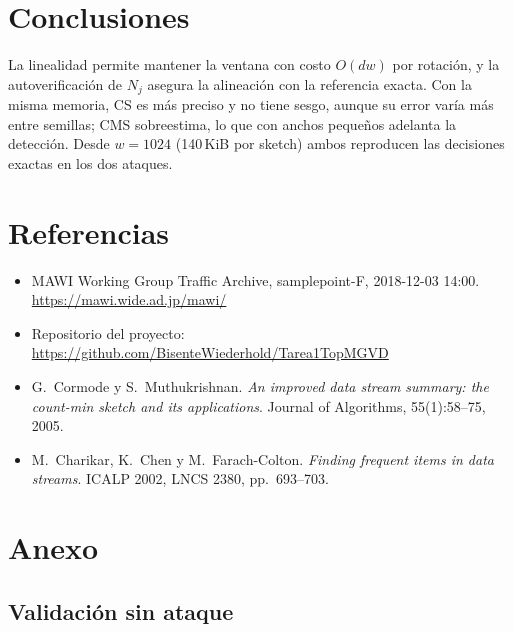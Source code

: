 \documentclass[11pt]{article}
\begin{document}
\section{Conclusiones}

La linealidad permite mantener la ventana con costo $O(dw)$ por rotación, y la autoverificación de $N_j$ asegura la alineación con la referencia exacta. Con la misma memoria, CS es más preciso y no tiene sesgo, aunque su error varía más entre semillas; CMS sobreestima, lo que con anchos pequeños adelanta la detección. Desde $w=1024$ (140\,KiB por sketch) ambos reproducen las decisiones exactas en los dos ataques.

\section{Referencias}

\begin{itemize}
    \item MAWI Working Group Traffic Archive, samplepoint-F, 2018-12-03 14:00. \url{https://mawi.wide.ad.jp/mawi/}
    \item Repositorio del proyecto: \url{https://github.com/BisenteWiederhold/Tarea1TopMGVD}
    \item G.~Cormode y S.~Muthukrishnan. \emph{An improved data stream summary: the count-min sketch and its applications}. Journal of Algorithms, 55(1):58--75, 2005.
    \item M.~Charikar, K.~Chen y M.~Farach-Colton. \emph{Finding frequent items in data streams}. ICALP 2002, LNCS 2380, pp.~693--703.
\end{itemize}

\newpage
\appendix
\section{Anexo}

\subsection{Validación sin ataque}
\end{document}
